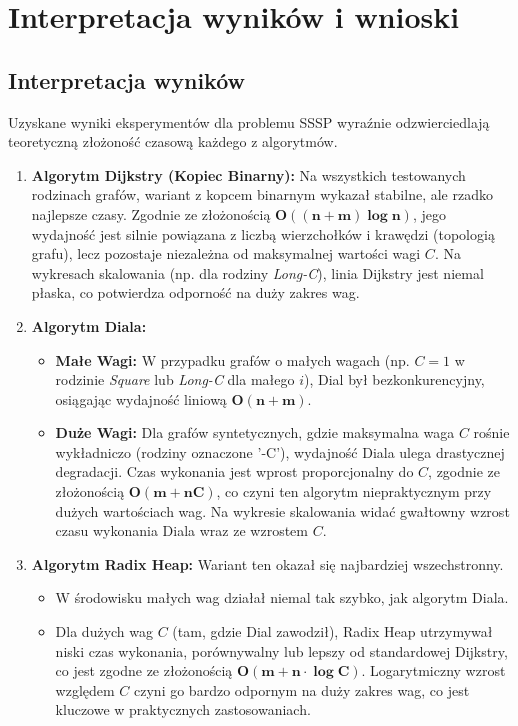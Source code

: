 \documentclass[11pt, a4paper]{article}
\begin{document}
\clearpage
\section{Interpretacja wyników i wnioski}

\subsection{Interpretacja wyników}

Uzyskane wyniki eksperymentów dla problemu SSSP wyraźnie odzwierciedlają teoretyczną złożoność czasową każdego z algorytmów.

\begin{enumerate}
	\item \textbf{Algorytm Dijkstry (Kopiec Binarny):} Na wszystkich testowanych rodzinach grafów, wariant z kopcem binarnym wykazał stabilne, ale rzadko najlepsze czasy. Zgodnie ze złożonością $\mathbf{O((n+m) \log n)}$, jego wydajność jest silnie powiązana z liczbą wierzchołków i krawędzi (topologią grafu), lecz pozostaje niezależna od maksymalnej wartości wagi $C$. Na wykresach skalowania (np. dla rodziny \textit{Long-C}), linia Dijkstry jest niemal płaska, co potwierdza odporność na duży zakres wag.
	
	\item \textbf{Algorytm Diala:}
	\begin{itemize}
		\item \textbf{Małe Wagi:} W przypadku grafów o małych wagach (np. $C=1$ w rodzinie \textit{Square} lub \textit{Long-C} dla małego $i$), Dial był bezkonkurencyjny, osiągając wydajność liniową $\mathbf{O(n+m)}$.
		\item \textbf{Duże Wagi:} Dla grafów syntetycznych, gdzie maksymalna waga $C$ rośnie wykładniczo (rodziny oznaczone '-C'), wydajność Diala ulega drastycznej degradacji. Czas wykonania jest wprost proporcjonalny do $C$, zgodnie ze złożonością $\mathbf{O(m + nC)}$, co czyni ten algorytm niepraktycznym przy dużych wartościach wag. Na wykresie skalowania widać gwałtowny wzrost czasu wykonania Diala wraz ze wzrostem $C$.
	\end{itemize}
	
	\item \textbf{Algorytm Radix Heap:} Wariant ten okazał się najbardziej wszechstronny.
	\begin{itemize}
		\item W środowisku małych wag działał niemal tak szybko, jak algorytm Diala.
		\item Dla dużych wag $C$ (tam, gdzie Dial zawodził), Radix Heap utrzymywał niski czas wykonania, porównywalny lub lepszy od standardowej Dijkstry, co jest zgodne ze złożonością $\mathbf{O\left(m + n \cdot \log C\right)}$. Logarytmiczny wzrost względem $C$ czyni go bardzo odpornym na duży zakres wag, co jest kluczowe w praktycznych zastosowaniach.
	\end{itemize}
	

\end{enumerate}
\end{document}
